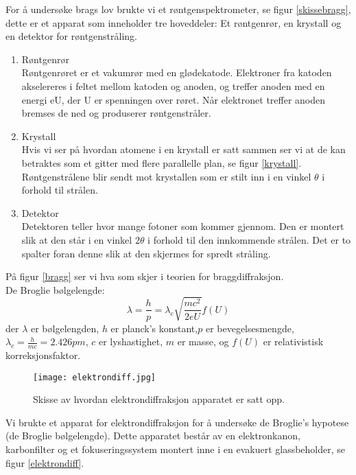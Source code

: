 \documentclass[norsk,a4paper,12pt]{article}
\begin{document}
For å undersøke brags lov brukte vi et røntgenspektrometer, se figur \vref{skissebragg}, dette er et apparat som inneholder tre hoveddeler: Et røntgenrør, en krystall og en detektor for røntgenstråling.
\begin{enumerate}
\item Røntgenrør\\
Røntgenrøret er et vakumrør med en glødekatode. Elektroner fra katoden akselereres i feltet mellom katoden og anoden, og treffer anoden med en energi eU, der U er spenningen over røret. Når elektronet treffer anoden bremses de ned og produserer røntgenstråler.
\item Krystall \\
Hvis vi ser på hvordan atomene i en krystall er satt sammen ser vi at de kan betraktes som et gitter med flere parallelle plan, se figur \vref{krystall}.
Røntgenstrålene blir sendt mot krystallen som er stilt inn i en vinkel $\theta$ i forhold til strålen. 
\item Detektor \\
Detektoren teller hvor mange fotoner som kommer gjennom. Den er montert slik at den står i en vinkel $2\theta$ i forhold til den innkommende strålen. Det er to spalter foran denne slik at den skjermes for spredt stråling.
\end{enumerate}

På figur \vref{bragg} ser vi hva som skjer i teorien for braggdiffraksjon.\\

De Broglie bølgelengde: 
\begin{equation}
\lambda = \frac{h}{p} = \lambda_c\sqrt{\frac{mc^2}{2eU}}f(U)
\label{broglie}
\end{equation}
der $\lambda$ er bølgelengden, $h$ er planck's konstant,$p$ er bevegelsesmengde,  $\lambda_c = \frac{h}{mc}= 2.426 pm$, $c$ er lyshastighet, $m$ er masse, og $f(U)$ er relativistisk korreksjonsfaktor.\\

\begin{figure}[h!]
	\begin{center}
  	\texttt{[image: elektrondiff.jpg]}\\
	\caption[Skisse av elektronkanonen]{Skisse av hvordan elektrondiffraksjon apparatet er satt opp.}
	\label{elektrondiff}
	\end{center}
\end{figure}

Vi brukte et apparat for elektrondiffraksjon for å undersøke de Broglie's hypotese (de Broglie bølgelengde). Dette apparatet består av en elektronkanon, karbonfilter og et fokuseringssystem montert inne i en evakuert glassbeholder, se figur \vref{elektrondiff}.\\
\end{document}
